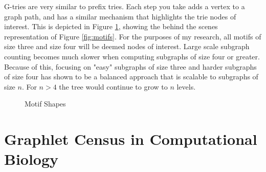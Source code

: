 \documentclass[12pt,twoside]{reedthesis}
\begin{document}
G-tries are very similar to prefix tries. Each step you take adds a vertex to a graph path, and has a similar mechanism that highlights the trie nodes of interest. This is depicted in Figure \ref{fig:motif_shapes}, showing the behind the scenes representation of Figure \ref{fig:motifs}. For the purposes of my research, all motifs of size three and size four will be deemed nodes of interest. Large scale subgraph counting becomes much slower when computing subgraphs of size four or greater. Because of this, focusing on "easy" subgraphs of size three and harder subgraphs of size four has shown to be a balanced approach that is scalable to subgraphs of size $n$. For $n > 4$ the tree would continue to grow to $n$ levels.

\begin{figure}[h]
	\caption{Motif Shapes}
	\centering
	\label{fig:motif_shapes}
\end{figure}


\section{Graphlet Census in Computational Biology}
\end{document}
